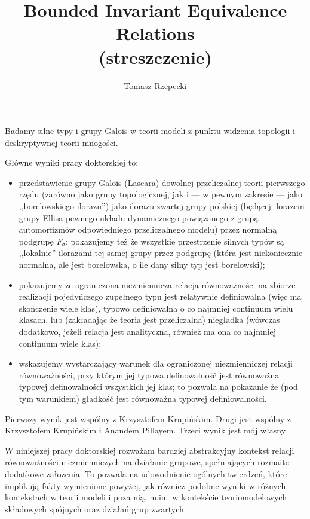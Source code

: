 \documentclass[12pt,a4paper]{article}
\title{Bounded Invariant Equivalence Relations\\(streszczenie)}
\author{Tomasz Rzepecki}
\date{}
\begin{document}
	\maketitle
	
	Badamy silne typy i grupy Galois w teorii modeli z punktu widzenia topologii i deskryptywnej teorii mnogości.
	
	Główne wyniki pracy doktorskiej to:
	\begin{itemize}
		\item 
		przedstawienie grupy Galois (Lascara) dowolnej przeliczalnej teorii pierwszego rzędu (zarówno jako grupy topologicznej, jak i --- w pewnym zakresie --- jako ,,borelowskiego ilorazu'') jako ilorazu zwartej grupy polskiej (będącej ilorazem grupy Ellisa pewnego układu dynamicznego powiązanego z grupą automorfizmów odpowiedniego przeliczalnego modelu) przez normalną podgrupę $F_\sigma$; pokazujemy też że wszystkie przestrzenie silnych typów są ,,lokalnie'' ilorazami tej samej grupy przez podgrupę (która jest niekoniecznie normalna, ale jest borelowska, o ile dany silny typ jest borelowski);
		\item 
		pokazujemy że ograniczona niezmiennicza relacja równoważności na zbiorze realizacji pojedyńczego zupełnego typu jest relatywnie definiowalna (więc ma skończenie wiele klas), typowo definiowalna o co najmniej continuum wielu klasach, lub (zakładając że teoria jest przeliczalna) niegładka (wówczas dodatkowo, jeżeli relacja jest analityczna, również ma ona co najmniej continuum wiele klas);
		\item 
		wskazujemy wystarczający warunek dla ograniczonej niezmienniczej relacji równoważności, przy którym jej typowa definowalność jest równoważna typowej definowalności wszystkich jej klas; to pozwala na pokazanie że (pod tym warunkiem) gładkość jest równoważna typowej definiowalności.
	\end{itemize}
	Pierwszy wynik jest wspólny z Krzysztofem Krupińskim. Drugi jest wspólny z Krzysztofem Krupińskim i Anandem Pillayem. Trzeci wynik jest mój własny.
	
	W niniejszej pracy doktorskiej rozważam bardziej abstrakcyjny kontekst relacji równoważności niezmienniczych na działanie grupowe, spełniających rozmaite dodatkowe założenia. To pozwala na udowodnienie ogólnych twierdzeń, które implikują fakty wymienione powyżej, jak również podobne wyniki w różnych kontekstach w teorii modeli i poza nią, m.in.\ w kontekście teoriomodelowych składowych spójnych oraz działań grup zwartych.
	
\end{document}
